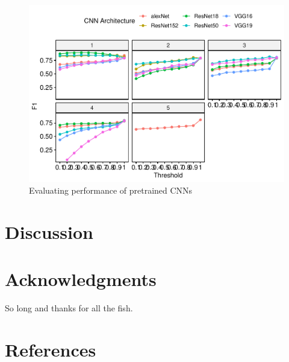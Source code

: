 \documentclass[fleqn,10pt,lineno]{wlpeerj} %
\begin{document}
\begin{figure}
\centering
\includegraphics{gibbonNetR-MS-format_files/figure-latex/unnamed-chunk-3-1.pdf}
\caption{Evaluating performance of pretrained CNNs}
\end{figure}

\hypertarget{discussion}{%
\section{Discussion}\label{discussion}}

\hypertarget{acknowledgments}{%
\section{Acknowledgments}\label{acknowledgments}}

So long and thanks for all the fish.

\hypertarget{references}{%
\section*{References}\label{references}}
\end{document}
